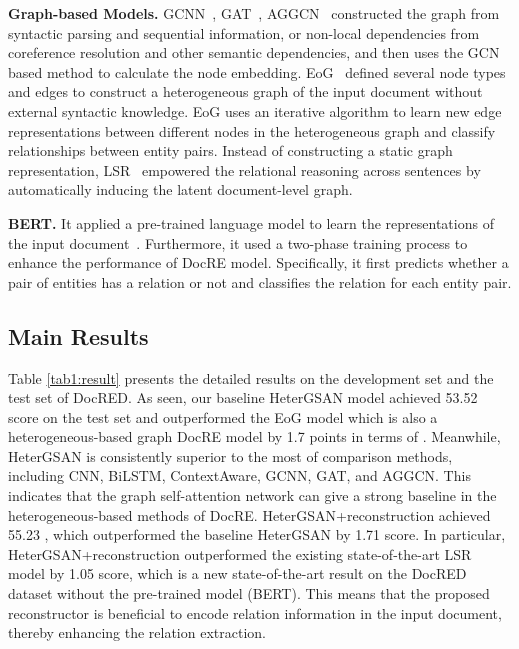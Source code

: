 \documentclass[letterpaper]{article} \usepackage{aaai21}  \usepackage{times}  \usepackage{helvet} \usepackage{courier}  \usepackage[hyphens]{url}  \usepackage{graphicx} \urlstyle{rm} \def\UrlFont{\rm}  \usepackage{natbib}  \usepackage{caption} \frenchspacing  \setlength{\pdfpagewidth}{8.5in}  \setlength{\pdfpageheight}{11in}  \usepackage{amsmath}
\begin{document}
  \textbf{Graph-based Models.}
GCNN~\cite{sahu-etal-2019-inter}, GAT~\cite{Velickovic2018GraphAN}, AGGCN~\cite{guo-etal-2019-attention} constructed the graph from syntactic parsing and sequential information, or non-local dependencies from coreference resolution and other semantic dependencies, and then uses the GCN based method to calculate the node embedding. 
EoG~\cite{Christopoulou2019ConnectingTD} defined several node types and edges to construct a heterogeneous graph of the input document without external syntactic knowledge. EoG uses an iterative algorithm to learn new edge representations between different nodes in the heterogeneous graph and classify relationships between entity pairs. 
Instead of constructing a static graph representation, LSR~\cite{Nan2020ReasoningWL} empowered the relational reasoning across sentences by automatically inducing the latent document-level graph.



  \textbf{BERT.} 
It applied a pre-trained language model to learn the representations of the input document~\cite{Wang2019FinetuneBF,Devlin2019BERTPO}.
Furthermore, it used a two-phase training process to enhance the performance of DocRE model. 
Specifically, it first predicts whether a pair of entities has a relation or not and classifies the relation for each entity pair.

\subsection{Main Results}
Table \ref{tab1:result} presents the detailed results on the development set and the test set of DocRED. 
As seen, our baseline HeterGSAN model achieved 53.52  score on the test set and outperformed the EoG model which is also a heterogeneous-based graph DocRE model by 1.7 points in terms of .
Meanwhile, HeterGSAN is consistently superior to the most of comparison methods, including CNN, BiLSTM, ContextAware, GCNN, GAT, and AGGCN.
This indicates that the graph self-attention network can give a strong baseline in the heterogeneous-based methods of DocRE.
HeterGSAN+reconstruction achieved 55.23 , which outperformed the baseline HeterGSAN by 1.71  score.
In particular, HeterGSAN+reconstruction outperformed the existing state-of-the-art LSR model by 1.05  score, which is a new state-of-the-art result on the DocRED dataset without the pre-trained model (BERT).
This means that the proposed reconstructor is beneficial to encode relation information in the input document, thereby enhancing the relation extraction.
\end{document}
